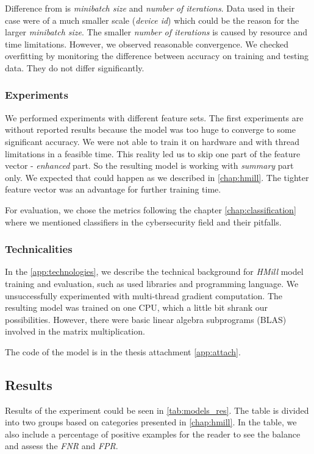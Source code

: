 Difference from \cite{Mandlik2020} is \emph{minibatch size} and \emph{number of iterations}. Data used in their case were of a much smaller scale (\emph{device id}) which could be the reason for the larger \emph{minibatch size}. The smaller \emph{number of iterations} is caused by resource and time limitations. However, we observed reasonable convergence.  We checked overfitting by monitoring the difference between accuracy on training and testing data. They do not differ significantly.

\subsubsection{Experiments}
We performed experiments with different feature sets. The first experiments are without reported results because the model was too huge to converge to some significant accuracy. We were not able to train it on hardware and with thread limitations in a feasible time. This reality led us to skip one part of the feature vector - \emph{enhanced} part. So the resulting model is working with \emph{summary} part only.  We expected that could happen as we described in \ref{chap:hmill}. The tighter feature vector was an advantage for further training time.

For evaluation, we chose the metrics following the chapter \ref{chap:classification} where we mentioned classifiers in the cybersecurity field and their pitfalls.

\subsubsection{Technicalities}
In the \ref{app:technologies}, we describe the technical background for \emph{HMill} model training and evaluation, such as used libraries and programming language. We unsuccessfully experimented with multi-thread gradient computation. The resulting model was trained on one CPU, which a little bit shrank our possibilities. However, there were basic linear algebra subprograms (BLAS) involved in the matrix multiplication.

The code of the model is in the thesis attachment \ref{app:attach}.

\subsection{Results}
Results of the experiment could be seen in \ref{tab:models_res}. The table is divided into two groups based on categories presented in \ref{chap:hmill}. In the table, we also include a percentage of positive examples for the reader to see the balance and assess the \emph{FNR} and \emph{FPR}.

